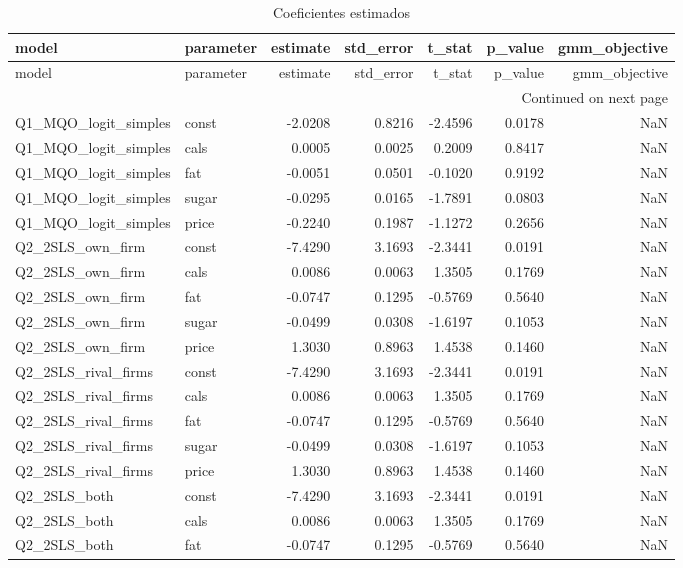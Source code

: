 \scriptsize
\begin{longtable}{llrrrrr}
\caption{Coeficientes estimados}\label{tab:all-coef}\\
\toprule
model & parameter & estimate & std_error & t_stat & p_value & gmm_objective \\
\midrule
\endfirsthead
\toprule
model & parameter & estimate & std_error & t_stat & p_value & gmm_objective \\
\midrule
\endhead
\midrule
\multicolumn{7}{r}{Continued on next page} \\
\midrule
\endfoot
\bottomrule
\endlastfoot
Q1\_MQO\_logit\_simples & const & -2.0208 & 0.8216 & -2.4596 & 0.0178 & NaN \\
Q1\_MQO\_logit\_simples & cals & 0.0005 & 0.0025 & 0.2009 & 0.8417 & NaN \\
Q1\_MQO\_logit\_simples & fat & -0.0051 & 0.0501 & -0.1020 & 0.9192 & NaN \\
Q1\_MQO\_logit\_simples & sugar & -0.0295 & 0.0165 & -1.7891 & 0.0803 & NaN \\
Q1\_MQO\_logit\_simples & price & -0.2240 & 0.1987 & -1.1272 & 0.2656 & NaN \\
Q2\_2SLS\_own\_firm & const & -7.4290 & 3.1693 & -2.3441 & 0.0191 & NaN \\
Q2\_2SLS\_own\_firm & cals & 0.0086 & 0.0063 & 1.3505 & 0.1769 & NaN \\
Q2\_2SLS\_own\_firm & fat & -0.0747 & 0.1295 & -0.5769 & 0.5640 & NaN \\
Q2\_2SLS\_own\_firm & sugar & -0.0499 & 0.0308 & -1.6197 & 0.1053 & NaN \\
Q2\_2SLS\_own\_firm & price & 1.3030 & 0.8963 & 1.4538 & 0.1460 & NaN \\
Q2\_2SLS\_rival\_firms & const & -7.4290 & 3.1693 & -2.3441 & 0.0191 & NaN \\
Q2\_2SLS\_rival\_firms & cals & 0.0086 & 0.0063 & 1.3505 & 0.1769 & NaN \\
Q2\_2SLS\_rival\_firms & fat & -0.0747 & 0.1295 & -0.5769 & 0.5640 & NaN \\
Q2\_2SLS\_rival\_firms & sugar & -0.0499 & 0.0308 & -1.6197 & 0.1053 & NaN \\
Q2\_2SLS\_rival\_firms & price & 1.3030 & 0.8963 & 1.4538 & 0.1460 & NaN \\
Q2\_2SLS\_both & const & -7.4290 & 3.1693 & -2.3441 & 0.0191 & NaN \\
Q2\_2SLS\_both & cals & 0.0086 & 0.0063 & 1.3505 & 0.1769 & NaN \\
Q2\_2SLS\_both & fat & -0.0747 & 0.1295 & -0.5769 & 0.5640 & NaN \\

\end{longtable}
